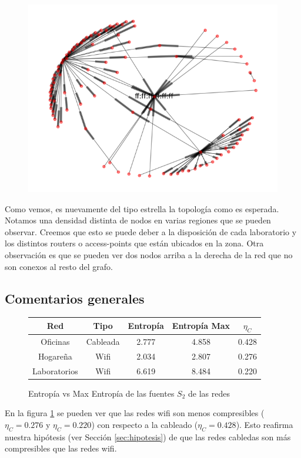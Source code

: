 \begin{figure}[hp!]
	\begin{center}
	 \includegraphics[scale=0.6]{../plots/labos_s2_topologia.png}
	\end{center}
\end{figure}

Como vemos, es nuevamente del tipo estrella la topología como es esperada. Notamos una densidad
distinta de nodos en varias regiones que se pueden observar. Creemos que esto se puede deber
a la disposición de cada laboratorio y los distintos routers o access-points que están ubicados en la zona.
Otra observación es que se pueden ver dos nodos arriba a la derecha de la red que no son conexos al resto del grafo.


\subsection{Comentarios generales}

\begin{figure}[hp!]
	\centering
	\begin{tabular}{|c|c|c|c|c|}
		\hline
		Red & Tipo & Entropía & Entropía Max & $\eta_{C}$ \\
		\hline
		Oficinas & Cableada & 2.777 & 4.858 & 0.428 \\
		\hline
		Hogareña & Wifi & 2.034 & 2.807 & 0.276 \\
		\hline
		Laboratorios & Wifi & 6.619 & 8.484 & 0.220 \\
		\hline
	\end{tabular}
	\caption{Entropía vs Max Entropía de las fuentes $S_2$ de las redes}
	\label{fig:tabla}
\end{figure}

En la figura \ref{fig:tabla} se pueden ver que las redes wifi son menos compresibles ($\eta_{C}=0.276$ y $\eta_{C}=0.220$)
con respecto a la cableado ($\eta_{C}=0.428$). Esto reafirma nuestra hipótesis (ver Sección \ref{sec:hipotesis}) de que las redes cabledas son más compresibles que
las redes wifi.
